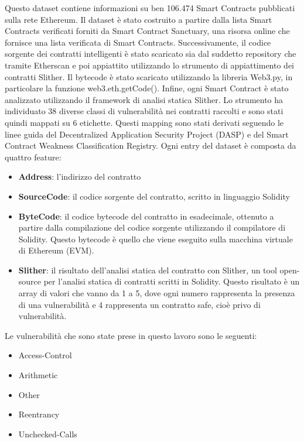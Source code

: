 \documentclass[../../Thesis.tex]{subfiles}
\begin{document}
Questo dataset contiene informazioni su ben 106.474 Smart Contracts pubblicati sulla rete Ethereum. Il dataset \`e stato costruito a partire dalla lista Smart Contracts verificati forniti da Smart Contract Sanctuary, una risorsa online che fornisce una lista verificata di Smart Contracts. Successivamente, il codice sorgente dei contratti intelligenti \`e stato scaricato sia dal suddetto repository che tramite Etherscan e poi appiattito utilizzando lo strumento di appiattimento dei contratti Slither. Il bytecode \`e stato scaricato utilizzando la libreria Web3.py, in particolare la funzione web3.eth.getCode(). Infine, ogni Smart Contract \`e stato analizzato utilizzando il framework di analisi statica Slither. Lo strumento ha individuato 38 diverse classi di vulnerabilit\`a nei contratti raccolti e sono stati quindi mappati su 6 etichette. Questi mapping sono stati derivati seguendo le linee guida del Decentralized Application Security Project (DASP) e del Smart Contract Weakness Classification Registry. Ogni entry del dataset \`e composta da quattro feature:
\begin{itemize}
    \item  \textbf{Address}: l'indirizzo del contratto
    \item  \textbf{SourceCode}: il codice sorgente del contratto, scritto in linguaggio Solidity
    \item  \textbf{ByteCode}: il codice bytecode del contratto in esadecimale, ottenuto a partire dalla compilazione del codice sorgente utilizzando il compilatore di Solidity. Questo bytecode \`e quello che viene eseguito sulla macchina virtuale di Ethereum (EVM).
    \item  \textbf{Slither}: il risultato dell'analisi statica del contratto con Slither, un tool open-source per l'analisi statica di contratti scritti in Solidity. Questo risultato \`e un array di valori che vanno da 1 a 5, dove ogni numero  rappresenta la presenza di una vulnerabilit\`a e 4 rappresenta un contratto safe, cio\`e privo di vulnerabilit\`a.
\end{itemize}
Le vulnerabilit\`a che sono state prese in questo lavoro sono le seguenti:
\begin{itemize}
    \item Access-Control
    \item Arithmetic
    \item Other
    \item Reentrancy
    \item Unchecked-Calls
\end{itemize}
 
\end{document}
